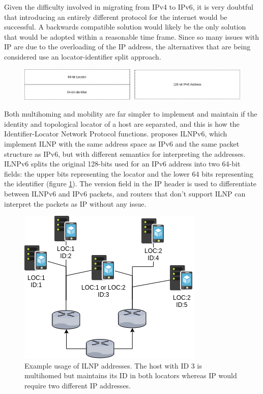 \documentclass[12pt]{article}
\begin{document}
Given the difficulty involved in migrating from IPv4 to IPv6, it is very doubtful that introducing an entirely different protocol for the internet would be successful. A backwards compatible solution would likely be the only solution that would be adopted within a reasonable time frame. Since so many issues with IP are due to the overloading of the IP address, the alternatives that are being considered use an locator-identifier split approach. 

\begin{figure}[!ht]
	\centering
	\includegraphics[width=\linewidth]{images/addresses}
	\caption{}
	\label{fig:addresses}
\end{figure}

Both multihoming and mobility are far simpler to implement and maintain if the identity and topological locator of a host are separated, and this is how the Identifier-Locator Network Protocol functions. \cite{5586444} proposes ILNPv6, which implement ILNP with the same address space as IPv6 and the same packet structure as IPv6, but with different semantics for interpreting the addresses. ILNPv6 splits the original 128-bits used for an IPv6 address into two 64-bit fields: the upper bits representing the locator and the lower 64 bits representing the identifier (figure \ref{fig:addresses}). The version field in the IP header is used to differentiate between ILNPv6 and IPv6 packets, and routers that don't support ILNP can interpret the packets as IP without any issue. 

\begin{figure}[!ht]
	\centering
	\includegraphics[width=0.6\linewidth]{images/ilnpexample}
	\caption{Example usage of ILNP addresses. The host with ID 3 is multihomed but maintains its ID in both locators whereas IP would require two different IP addresses.}
	\label{fig:ilnpexample}
\end{figure}
\end{document}
